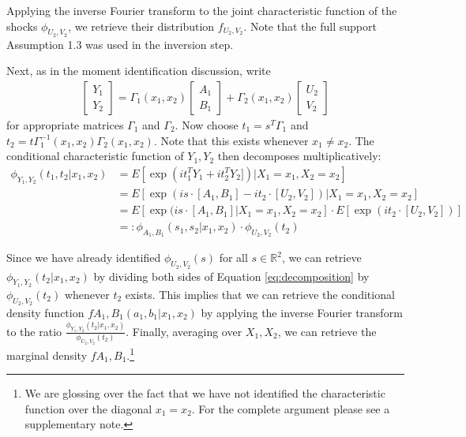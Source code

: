 Applying the inverse Fourier transform to the joint characteristic function of the shocks $\phi_{U_{2},V_{2}}$, we retrieve their distribution $f_{U_{2}, V_{2}}$. Note that the full support Assumption 1.3 was used in the inversion step.

Next, as in the moment identification discussion, write
\begin{align}
  \begin{bmatrix} Y_{1} \\ Y_{2} \end{bmatrix}
  =
  \Gamma_1(x_1, x_2) \begin{bmatrix} A_{1} \\ B_{1} \end{bmatrix} +
  \Gamma_2(x_1, x_2) \begin{bmatrix} U_{2} \\ V_{2} \end{bmatrix}  
\end{align}
\noindent for appropriate matrices $\Gamma_1$ and $\Gamma_2$. Now choose $t_1 = s^{T}\Gamma_{1}$ and $t_2 = t\Gamma_{1}^{-1}(x_1, x_2)\Gamma_2(x_1, x_2)$. Note that this exists whenever $x_1 \neq x_2$. The conditional characteristic function of $Y_{1}, Y_{2}$ then decomposes multiplicatively:
\begin{align}
\phi_{Y_{1}, Y_{2}}(t_1, t_2| x_1, x_2) &= E[\exp(it_1^{T}Y_{1} + it_2^{T}Y_{2}])  | X_{1} = x_1, X_{2} = x_2] \\
          &= E[\exp(is\cdot [A_1, B_1] - it_2 \cdot [U_2, V_2] ) | X_{1} = x_1, X_{2} = x_2] \\    
          &= E[\exp(is\cdot [A_1, B_1] | X_{1} = x_1, X_{2} = x_2]\cdot E[\exp(it_2 \cdot [U_2, V_2] )] \\
          &=: \phi_{A_1, B_1}(s_1, s_2 |x_1, x_2)\cdot  \phi_{U_2, V_2}(t_2) \label{eq:decomposition}
\end{align}

Since we have already identified $\phi_{U_2, V_2}(s)$ for all $s \in \mathbb{R}^2$, we can retrieve $\phi_{Y_1, Y_2}(t_2|x_1, x_2)$ by dividing both sides of Equation \ref{eq:decomposition} by $\phi_{U_2, V_2}(t_2)$ whenever $t_2$ exists. This implies that we can retrieve the conditional density function $f{A_1, B_1}(a_1, b_1 | x_1, x_2)$ by applying the inverse Fourier transform to the ratio $\frac{\phi_{Y_1, Y_2}(t_2|x_1, x_2)}{\phi_{U_2, V_2}(t_2)}$. Finally, averaging over $X_1, X_2$, we can retrieve the marginal density $f{A_1, B_1}$.\footnote{We are glossing over the fact that we have not identified the characteristic function over the diagonal $x_1 = x_2$. For the complete argument please see a supplementary note.}


